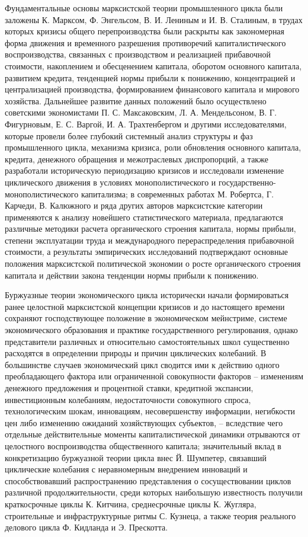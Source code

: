 Фундаментальные основы марксистской теории промышленного цикла были заложены К. Марксом, Ф. Энгельсом, В. И. Лениным и И. В. Сталиным, в трудах которых кризисы общего перепроизводства были раскрыты как закономерная форма движения и временного разрешения противоречий капиталистического воспроизводства, связанных с производством и реализацией прибавочной стоимости, накоплением и обесценением капитала, оборотом основного капитала, развитием кредита, тенденцией нормы прибыли к понижению, концентрацией и централизацией производства, формированием финансового капитала и мирового хозяйства. Дальнейшее развитие данных положений было осуществлено советскими экономистами П. С. Максаковским, Л. А. Мендельсоном, В. Г. Фигурновым, Е. С. Варгой, И. А. Трахтенбергом и другими исследователями, которые провели более глубокий системный анализ структуры и фаз промышленного цикла, механизма кризиса, роли обновления основного капитала, кредита, денежного обращения и межотраслевых диспропорций, а также разработали историческую периодизацию кризисов и исследовали изменение циклического движения в условиях монополистического и государственно-монополистического капитализма; в современных работах М. Робертса, Г. Карчеди, В. Калюжного и ряда других авторов марксистские категории применяются к анализу новейшего статистического материала, предлагаются различные методики расчета органического строения капитала, нормы прибыли, степени эксплуатации труда и международного перераспределения прибавочной стоимости, а результаты эмпирических исследований подтверждают основные положения марксистской политической экономии о росте органического строения капитала и действии закона тенденции нормы прибыли к понижению.

Буржуазные теории экономического цикла исторически начали формироваться ранее целостной марксистской концепции кризисов и до настоящего времени сохраняют господствующее положение в экономическом мейнстриме, системе экономического образования и практике государственного регулирования, однако представители различных и относительно самостоятельных школ существенно расходятся в определении природы и причин циклических колебаний. В большинстве случаев экономический цикл сводится ими к действию одного преобладающего фактора или ограниченной совокупности факторов – изменениям денежного предложения и процентной ставки, кредитной экспансии, инвестиционным колебаниям, недостаточности совокупного спроса, технологическим шокам, инновациям, несовершенству информации, негибкости цен либо изменению ожиданий хозяйствующих субъектов, – вследствие чего отдельные действительные моменты капиталистической динамики отрываются от целостного воспроизводства общественного капитала; значительный вклад в конкретизацию буржуазной теории цикла внес Й. Шумпетер, связавший циклические колебания с неравномерным внедрением инноваций и способствовавший распространению представления о сосуществовании циклов различной продолжительности, среди которых наибольшую известность получили краткосрочные циклы К. Китчина, среднесрочные циклы К. Жугляра, строительные и инфраструктурные ритмы С. Кузнеца, а также теория реального делового цикла Ф. Кидланда и Э. Прескотта.

